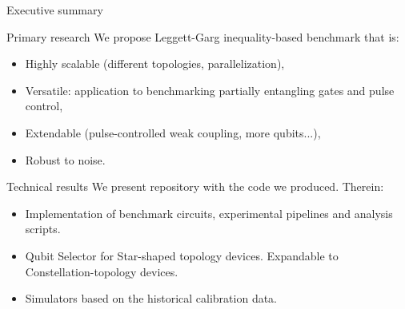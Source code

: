 \documentclass{beamer}
\begin{document}
	\begin{frame}{Executive summary}
		
		\vspace{-0.3cm}
		
		\begin{block}{Primary research}
			We propose Leggett-Garg inequality-based benchmark that is:
			\begin{itemize}

				\item Highly scalable (different topologies, parallelization),
				
				\item Versatile: application to benchmarking partially entangling gates and pulse control,
				
				\item Extendable (pulse-controlled weak coupling, more qubits...),
				
				\item Robust to noise.
				
			\end{itemize}
		\end{block} 
	
		\vspace{-0.2cm}
	
		\begin{block}{Technical results}
			We present repository with the code we produced. Therein:
			\begin{itemize}

				\item Implementation of benchmark circuits, experimental
				pipelines and analysis scripts.
				
				\item Qubit Selector for Star-shaped topology devices. Expandable to Constellation-topology devices.
				
				\item Simulators based on the historical calibration data.
				
			\end{itemize}
		\end{block}
	
	
	\end{frame}
	
\end{document}
